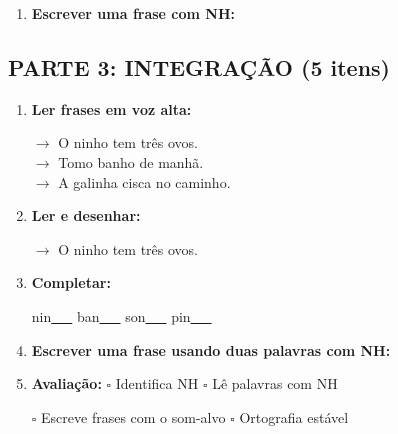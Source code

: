 \begin{exercicio}
\begin{enumerate}[resume]
  \item \textbf{Escrever uma frase com NH:}
  \begin{center}
  \underline{\hspace{12cm}}
  \end{center}

\end{enumerate}

\subsection*{PARTE 3: INTEGRAÇÃO (5 itens)}

\begin{enumerate}[resume]

  \item \textbf{Ler frases em voz alta:}
  \begin{center}
  $\rightarrow$ O ninho tem três ovos.\\
  $\rightarrow$ Tomo banho de manhã.\\
  $\rightarrow$ A galinha cisca no caminho.\\
  \end{center}

  \item \textbf{Ler e desenhar:}
  \begin{center}
  $\rightarrow$ O ninho tem três ovos.
  \end{center}
  \begin{center}
  \end{center}

  \item \textbf{Completar:}
  \begin{center}
  nin\underline{~~~} \quad ban\underline{~~~} \quad son\underline{~~~} \quad pin\underline{~~~}
  \end{center}

  \item \textbf{Escrever uma frase usando duas palavras com NH:}
  \begin{center}
  \underline{\hspace{12cm}}
  \end{center}

  \item \textbf{Avaliação:} $\square$ Identifica NH \quad $\square$ Lê palavras com NH
  \begin{center}
  $\square$ Escreve frases com o som-alvo \quad $\square$ Ortografia estável
  \end{center}


\end{enumerate}
\end{exercicio}
